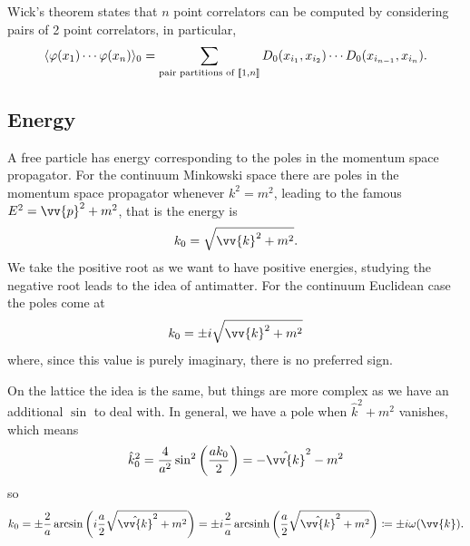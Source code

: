 \documentclass[fleqn]{NotesClass}
\DeclarePairedDelimiter{\correlator}{\langle}{\rangle}
\newcommand{\integerRange}[2]{[\![#1, #2]\!]}
\DeclareMathOperator{\arcsinh}{arcsinh}
\begin{document}
    Wick's theorem states that \(n\) point correlators can be computed by considering pairs of 2 point correlators, in particular,
    \begin{equation}
        \correlator{\varphi(x_1) \dotsm \varphi(x_n)}_0 = \sum_{\text{pair partitions of }\integerRange{1}{n}} D_0(x_{i_1}, x_{i_2}) \dotsm D_0(x_{i_{n-1}}, x_{i_n}).
    \end{equation}
    
    \subsection{Energy}
    A free particle has energy corresponding to the poles in the momentum space propagator.
    For the continuum Minkowski space there are poles in the momentum space propagator whenever \(k^2 = m^2\), leading to the famous \(E^2 = \vv{p}^2 + m^2\), that is the energy is
    \begin{equation}
        k_0 = \sqrt{\vv{k}^2 + m^2}.
    \end{equation}
    We take the positive root as we want to have positive energies, studying the negative root leads to the idea of antimatter.
    For the continuum Euclidean case the poles come at
    \begin{equation}
        k_0 = \pm i\sqrt{\vv{k}^2 + m^2}
    \end{equation}
    where, since this value is purely imaginary, there is no preferred sign.
    
    On the lattice the idea is the same, but things are more complex as we have an additional \(\sin\) to deal with.
    In general, we have a pole when \(\hat{k}^2 + m^2\) vanishes, which means
    \begin{equation}
        \hat{k}_0^2 = \frac{4}{a^2} \sin^2\left( \frac{ak_0}{2} \right) = -\hat{\vv{k}}^2 - m^2
    \end{equation}
    so
    \begin{equation*}
        k_0 = \pm \frac{2}{a} \arcsin\left( i \frac{a}{2}\sqrt{\hat{\vv{k}}^2 + m^2} \right) = \pm i \frac{2}{a} \arcsinh\left( \frac{a}{2} \sqrt{\hat{\vv{k}}^2 + m^2} \right) \coloneqq \pm i \omega(\vv{k}).
    \end{equation*}
    
\end{document}
